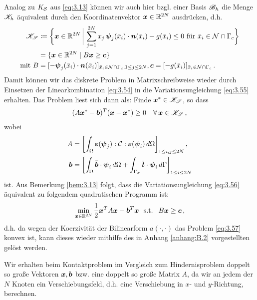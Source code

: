 Analog zu $K_{\mathcal S}$ aus \eqref{eq:3.13} können wir auch hier bzgl. einer Basis $\mathscr B_h$ die Menge $\mathscr K_h$ äquivalent durch den Koordinatenvektor $\boldsymbol x \in \mathbb{R}^{2N}$ ausdrücken, d.h.
\begin{align*}
	\mathscr K_{\mathscr S}  &\coloneqq \bigg\{ \boldsymbol x \in \mathbb{R}^{2N} \,\bigg| \, \sum_{j=1}^{2N} x_j \, \boldsymbol \psi_j(\bar x_i) \cdot \boldsymbol n(\bar x_i) - g(\bar x_i) \le 0 \text{ für } \bar x_i \in \mathcal N \cap \Gamma_c\bigg\} \\
	& = \{ \boldsymbol x \in \mathbb{R}^{2N} \mid B\boldsymbol x \ge \boldsymbol c\} \\
	\text{mit }  B & =  [-\boldsymbol \psi_j(\bar x_i)\cdot \boldsymbol n(\bar x_i)]_{\bar x_i \in \mathcal N \cap \Gamma_c, 1\le j \le 2N} ,\boldsymbol c = [-g(\bar x_i)]_{\bar x_i \in\mathcal N \cap \Gamma_c} \, .
\end{align*}
Damit können wir das diskrete Problem in Matrixschreibweise wieder durch Einsetzen der Linearkombination \eqref{eq:3.54} in die Variationsungleichung \eqref{eq:3.55} erhalten. Das Problem liest sich dann als: Finde $\boldsymbol x^* \in \mathscr K_{\mathscr S}$, so dass
\begin{align}\label{eq:3.56}
	(A\boldsymbol x^* - \boldsymbol b)^T (\boldsymbol x - \boldsymbol x^*) \ge 0 \quad \forall \, \boldsymbol x\in \mathscr K_{\mathscr S} \, ,
\end{align}
wobei
\begin{align*}
	A &= \left[\int_\Omega \boldsymbol {\varepsilon} (\boldsymbol \psi_j):\mathcal C:\boldsymbol {\varepsilon}(\boldsymbol \psi_i) \, d\Omega\right]_{1 \le i,j\le 2N} , \\
	 \boldsymbol b& = \left[ \int_\Omega \bar{\boldsymbol b} \cdot \boldsymbol\psi_i \, d\Omega + \int_{\Gamma_\sigma} \bar{\boldsymbol 	t} \cdot \boldsymbol\psi_i \, d\Gamma\right]_{1\le i \le 2N}
\end{align*}
ist. Aus Bemerkung \ref{bem:3.13} folgt, dass die Variationsungleichung \eqref{eq:3.56} äquivalent zu folgendem quadratischen Programm ist:
\begin{align}\label{eq:3.57}
\min_{\bs x\in \R^{2N}} \frac 1 2 \bs x^T A \bs x - \bs b^T \bs x \ \text{ s.t. } \ B\bs x \ge \bs c \, ,
\end{align}
d.h. da wegen der Koerzivität der Bilinearform $a(\cdot,\cdot)$ das Problem \eqref{eq:3.57} konvex ist, kann dieses wieder mithilfe des in Anhang \ref{anhang:B.2} vorgestellten  gelöst werden.

\begin{bem}\label{bem:3.25}
Wir erhalten beim Kontaktproblem im Vergleich zum Hindernisproblem  doppelt so große Vektoren $\boldsymbol x, \boldsymbol b$ bzw. eine doppelt so große Matrix $A$, da wir an jedem der $N$ Knoten ein Verschiebungsfeld, d.h. eine Verschiebung in $x$- und $y$-Richtung, berechnen.
\end{bem}





\newpage

